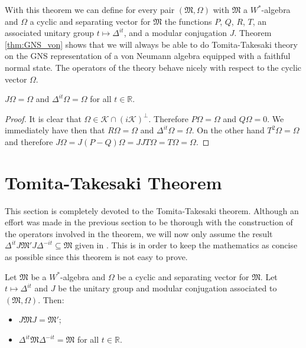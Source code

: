 With this theorem we can define for every pair $(\mathfrak{M},\Omega)$ with $\mathfrak{M}$ a $W^*$-algebra and $\Omega$ a cyclic and separating vector for $\mathfrak{M}$ the functions $P$, $Q$, $R$, $T$, an associated unitary group $t\mapsto\Delta^{it}$, and a modular conjugation $J$. Theorem \ref{thm:GNS_von} shows that we will always be able to do Tomita-Takesaki theory on the GNS representation of a von Neumann algebra equipped with a faithful normal state. The operators of the theory behave nicely with respect to the cyclic vector $\Omega$.

\begin{theorem}
$J\Omega=\Omega$ and $\Delta^{it}\Omega=\Omega$ for all $t\in\mathbb{R}$.
\end{theorem}

\begin{proof}
It is clear that $\Omega\in\mathcal{K}\cap(i\mathcal{K})^\bot$. Therefore $P\Omega=\Omega$ and $Q\Omega = 0$. We immediately have then that $R\Omega = \Omega$ and $\Delta^{it}\Omega=\Omega$. On the other hand $T^2\Omega=\Omega$ and therefore $J\Omega = J(P-Q)\Omega=JJT\Omega = T\Omega =\Omega$.
\end{proof}

\section{Tomita-Takesaki Theorem}

This section is completely devoted to the Tomita-Takesaki theorem. Although an effort was made in the previous section to be thorough with the construction of the operators involved in the theorem, we will now only assume the result $\Delta^{it}J\mathfrak{M}'J\Delta^{-it}\subseteq \mathfrak{M}$ given in \cite{Duvenhage1999}\cite{Rieffel1977}. This is in order to keep the mathematics as concise as possible since this theorem is not easy to prove.

\begin{theorem}\label{thm:Tomita-Takesaki}
Let $\mathfrak{M}$ be a $W^*$-algebra and $\Omega$ be a cyclic and separating vector for $\mathfrak{M}$. Let $t\mapsto\Delta^{it}$ and $J$ be the unitary group and modular conjugation associated to $(\mathfrak{M},\Omega)$. Then:
\begin{itemize}

\item $J\mathfrak{M}J=\mathfrak{M}'$;

\item $\Delta^{it}\mathfrak{M}\Delta^{-it}=\mathfrak{M}$ for all $t\in\mathbb{R}$. 

\end{itemize}
\end{theorem}

